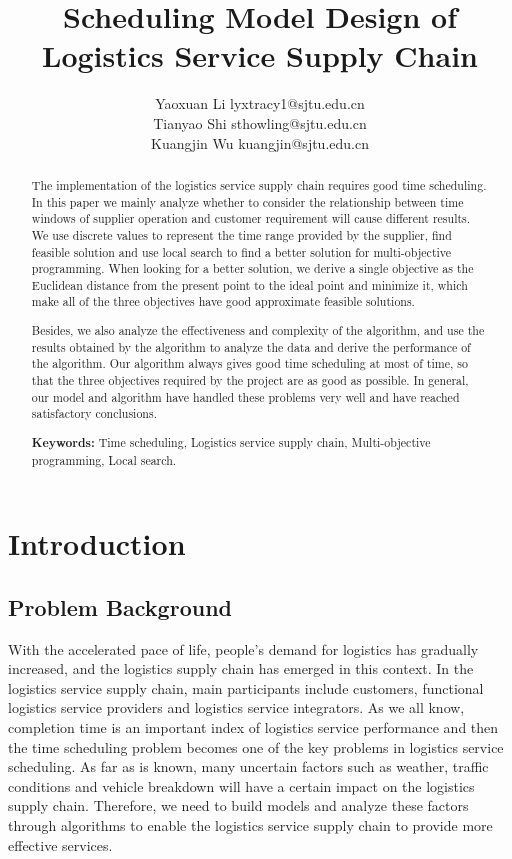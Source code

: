 \documentclass{llncs}
\title{Scheduling Model Design of Logistics Service Supply Chain}
\author{{Yaoxuan Li \quad517201910672 \quad lyxtracy1@sjtu.edu.cn} \\
{Tianyao Shi \quad517021910623 \quad sthowling@sjtu.edu.cn} \\
{Kuangjin Wu \quad517021910732 \quad kuangjin@sjtu.edu.cn}}
\institute{Department of Computer Science, \\ Shanghai Jiao Tong University, Shanghai, China}
\begin{document}



\maketitle
\begin{abstract}\vspace{-5mm}
    The implementation of the logistics service supply chain requires good time scheduling. In this paper we mainly analyze whether to consider the relationship between time windows of supplier operation and customer requirement will cause different results. We use discrete values to represent the time range provided by the supplier, find feasible solution and use local search to find a better solution for multi-objective programming. When looking for a better solution, we derive a single objective as the Euclidean distance from the present point to the ideal point and minimize it, which make all of the three objectives have good approximate feasible solutions.
    
    Besides, we also analyze the effectiveness and complexity of the algorithm, and use the results obtained by the algorithm to analyze the data and derive the performance of the algorithm. Our algorithm always gives good time scheduling at most of time, so that the three objectives required by the project are as good as possible. In general, our model and algorithm have handled these problems very well and have reached satisfactory conclusions.
    
    \textbf{Keywords:} Time scheduling, Logistics service supply chain,  Multi-objective programming, Local search.
    \end{abstract}


    \section{Introduction}


    \subsection{Problem Background}
    With the accelerated pace of life, people's demand for logistics has gradually increased, and the logistics supply chain has emerged in this context. In the logistics service supply chain, main participants include customers, functional logistics service providers and logistics service integrators. As we all know, completion time is an important index of logistics service performance and then the time scheduling problem becomes one of the key problems in logistics service scheduling. As far as is known, many uncertain factors such as weather, traffic conditions and vehicle breakdown will have a certain impact on the logistics supply chain. Therefore, we need to build models and analyze these factors through algorithms to enable the logistics service supply chain to provide more effective services.
\end{document}
